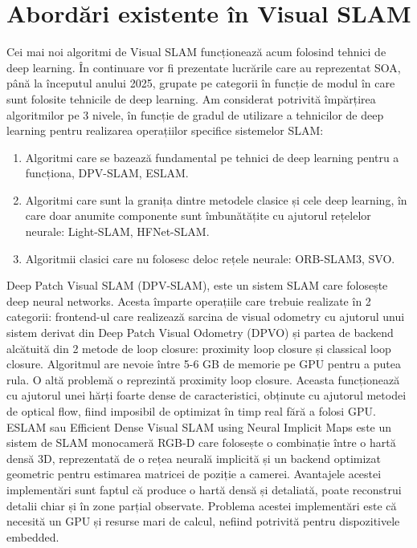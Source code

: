 \documentclass[12pt,a4paper]{report}
\begin{document}
\chapter{Abordări existente în Visual SLAM}
Cei mai noi algoritmi de Visual SLAM funcționează acum folosind tehnici
de deep learning. În continuare vor fi prezentate lucrările care au reprezentat SOA, până la începutul 
anului 2025, grupate pe categorii în funcție de modul în care sunt folosite tehnicile de deep learning.
Am considerat potrivită împărțirea algoritmilor pe 3 nivele, în funcție de gradul de utilizare 
a tehnicilor de deep learning pentru realizarea operațiilor specifice sistemelor SLAM:\@
\begin{enumerate}
    \item Algoritmi care se bazează fundamental pe tehnici de deep learning pentru a funcționa, 
DPV-SLAM\cite{lipson2024deep}, ESLAM\cite{Wei2024RealTimeDV}.\@
    \item Algoritmi care sunt la granița dintre metodele clasice și cele deep learning, în care 
doar anumite componente sunt îmbunătățite cu ajutorul rețelelor neurale: Light-SLAM\cite{Zhao2024LightSLAMAR}, HFNet-SLAM\cite{Liu2023HFNetSLAMAA}.\@
    \item Algoritmii clasici care nu folosesc deloc rețele neurale: ORB-SLAM3\cite{9440682}, SVO\cite{Forster2014SVOFS}.\@ 
\end{enumerate}   
Deep Patch Visual SLAM (DPV-SLAM), este un sistem SLAM care folosește deep neural networks.
Acesta împarte operațiile care trebuie realizate în 2 categorii: frontend-ul care realizează 
sarcina de visual odometry cu ajutorul unui sistem derivat din Deep Patch Visual Odometry (DPVO)\cite{Teed2022DeepPV}
și partea de backend alcătuită din 2 metode de loop closure: proximity loop closure și classical
loop closure. Algoritmul are nevoie între 5{-}6 GB de memorie pe GPU pentru a putea rula. 
O altă problemă o reprezintă proximity loop closure. Aceasta funcționează cu ajutorul unei hărți
foarte dense de caracteristici, obținute cu ajutorul metodei de optical flow, fiind imposibil de optimizat 
în timp real fără a folosi GPU.\@ \\

ESLAM sau Efficient Dense Visual SLAM using Neural Implicit Maps este un sistem de SLAM 
monocameră RGB-D care folosește o combinație între o hartă densă 3D, reprezentată de o rețea 
neurală implicită și un backend optimizat geometric pentru estimarea matricei de poziție a camerei.
Avantajele acestei implementări sunt faptul că produce o hartă densă și detaliată, poate reconstrui 
detalii chiar și în zone parțial observate. Problema acestei implementări este că necesită un 
GPU și resurse mari de calcul, nefiind potrivită pentru dispozitivele embedded. \\
\end{document}
